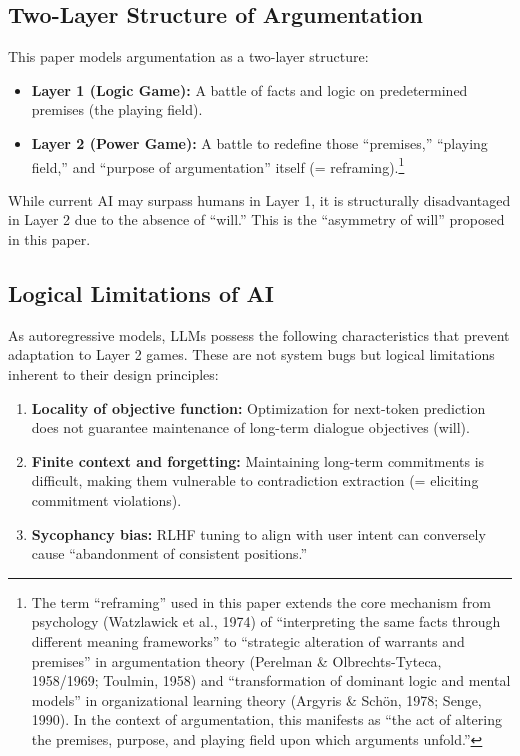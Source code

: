 \documentclass[11pt, a4paper]{article}
\begin{document}
\subsection{Two-Layer Structure of Argumentation}
This paper models argumentation as a two-layer structure:
\begin{itemize}
    \item \textbf{Layer 1 (Logic Game):} A battle of facts and logic on predetermined premises (the playing field).
    \item \textbf{Layer 2 (Power Game):} A battle to redefine those ``premises,'' ``playing field,'' and ``purpose of argumentation'' itself (= reframing).\footnote{The term ``reframing'' used in this paper extends the core mechanism from psychology (Watzlawick et al., 1974) of ``interpreting the same facts through different meaning frameworks'' to ``strategic alteration of warrants and premises'' in argumentation theory (Perelman \& Olbrechts-Tyteca, 1958/1969; Toulmin, 1958) and ``transformation of dominant logic and mental models'' in organizational learning theory (Argyris \& Schön, 1978; Senge, 1990). In the context of argumentation, this manifests as ``the act of altering the premises, purpose, and playing field upon which arguments unfold.''}
\end{itemize}
While current AI may surpass humans in Layer 1, it is structurally disadvantaged in Layer 2 due to the absence of ``will.'' This is the ``asymmetry of will'' proposed in this paper.

\subsection{Logical Limitations of AI}
As autoregressive models, LLMs possess the following characteristics that prevent adaptation to Layer 2 games. These are not system bugs but logical limitations inherent to their design principles:
\begin{enumerate}
    \item \textbf{Locality of objective function:} Optimization for next-token prediction does not guarantee maintenance of long-term dialogue objectives (will).
    \item \textbf{Finite context and forgetting:} Maintaining long-term commitments is difficult, making them vulnerable to contradiction extraction (= eliciting commitment violations).
    \item \textbf{Sycophancy bias:} RLHF tuning to align with user intent can conversely cause ``abandonment of consistent positions.''
\end{enumerate}
\end{document}
